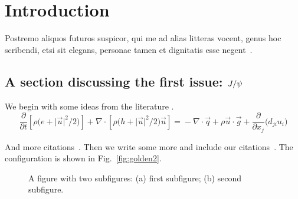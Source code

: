 

\chapter{Introduction}

\lipsum[1-2] Postremo aliquos futuros suspicor, qui me ad alias litteras vocent, genus hoc scribendi, etsi sit elegans, personae tamen et dignitatis esse negent~\cite{DKE1969,ww1920,kirk2288a,churchill1948,gibbs1863}.

\newcommand*{\Jpsi}{\ifpdftex\mathord{\bm{J}/\bm{\psi}}\else\mathord{\symbfit{J/\psi}}\fi} %

\section[A section discussing the first issue: \(J/\psi\)]{A section discussing the first issue: \( \Jpsi \) }

We begin with some ideas from the literature \cite{Fong2015,sharpe1}. 
\begin{equation}\label{eqn:1}
\frac{\partial}{\partial t}\left[\rho\bigl(e + \lvert\vec{u}\rvert^2\big/2\bigr)\right]  + \nabla\cdot\left[\rho\bigl(h + \lvert\vec{u}\rvert^2\big/2 \bigr)\vec{u}\right]
 ={}-\nabla \cdot \vec{q} +  \rho \vec{u}\cdot\vec{g}+ \frac{\partial}{\partial x_j}\bigl(d_{ji}u_i\bigr)
\end{equation}
 \lipsum[3]

\lipsum[4] And more citations~\cite{sharpe1,GSL}.  Then we write some more and include our citations~\cite{Swaminathan2017IDABRO,dlmf,amsmath}. The configuration is shown in Fig.~\ref{fig:golden2}.

\begin{figure}[t]
\begin{subfigure}[c]{0.495\textwidth}
%
\end{subfigure}
\begin{subfigure}[c]{0.495\textwidth}
%
%
\end{subfigure}%
\caption{A figure with two subfigures: (a) first subfigure; (b) second subfigure.\label{fig:4}}
\end{figure}

